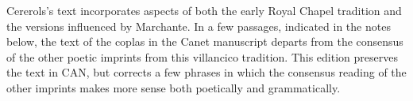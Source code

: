 Cererols's text incorporates aspects of both the early Royal Chapel tradition 
and the versions influenced by Marchante.
In a few passages, indicated in the notes below, the text of the coplas in the 
Canet manuscript departs from the consensus of the other poetic imprints from 
this villancico tradition.
This edition preserves the text in CAN, but corrects a few phrases in which the 
consensus reading of the other imprints makes more sense both poetically and 
grammatically.


\criticalnotesheader

